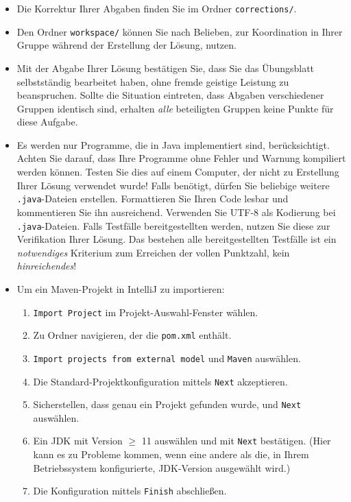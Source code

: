 \documentclass[german, solution]{acAssignment}
\begin{document}
\begin{itemize}
    \item Die Korrektur Ihrer Abgaben finden Sie im Ordner \texttt{corrections/}.
    
    \item Den Ordner \texttt{workspace/} können Sie nach Belieben, zur Koordination in Ihrer Gruppe während der Erstellung der Lösung, nutzen.
    
    \item Mit der Abgabe Ihrer Lösung bestätigen Sie, dass Sie das Übungsblatt selbstständig bearbeitet haben, ohne fremde geistige Leistung zu beanspruchen.
        Sollte die Situation eintreten, dass Abgaben verschiedener Gruppen identisch sind, erhalten \emph{alle} beteiligten Gruppen keine Punkte für diese Aufgabe.
    
    \item Es werden nur Programme, die in Java implementiert sind, berücksichtigt.
        Achten Sie darauf, dass Ihre Programme ohne Fehler und Warnung kompiliert werden können.
        Testen Sie dies auf einem Computer, der nicht zu Erstellung Ihrer Lösung verwendet wurde!
        Falls benötigt, dürfen Sie beliebige weitere \texttt{.java}-Dateien erstellen.
        Formattieren Sie Ihren Code lesbar und kommentieren Sie ihn ausreichend.
        Verwenden Sie UTF-8 als Kodierung bei \texttt{.java}-Dateien.
        Falls Testfälle bereitgestellten werden, nutzen Sie diese zur Verifikation Ihrer Lösung.
        Das bestehen alle bereitgestellten Testfälle ist ein \emph{notwendiges} Kriterium zum Erreichen der vollen Punktzahl, kein \emph{hinreichendes}!
    
    \clearpage
    \item Um ein Maven-Projekt in IntelliJ zu importieren:
        
        \begin{enumerate}
            \item \texttt{Import Project} im Projekt-Auswahl-Fenster wählen.
            \item Zu Ordner navigieren, der die \texttt{pom.xml} enthält.
            \item \texttt{Import projects from external model} und \texttt{Maven} auswählen.
            \item Die Standard-Projektkonfiguration mittels \texttt{Next} akzeptieren.
            \item Sicherstellen, dass genau ein Projekt gefunden wurde, und \texttt{Next} auswählen.
            \item Ein JDK mit Version $\geq$ 11 auswählen und mit \texttt{Next} bestätigen.
                (Hier kann es zu Probleme kommen, wenn eine andere als die, in Ihrem Betriebssystem konfigurierte, JDK-Version ausgewählt wird.)
            \item Die Konfiguration mittels \texttt{Finish} abschließen.
        \end{enumerate}
    

\end{itemize}
\end{document}
